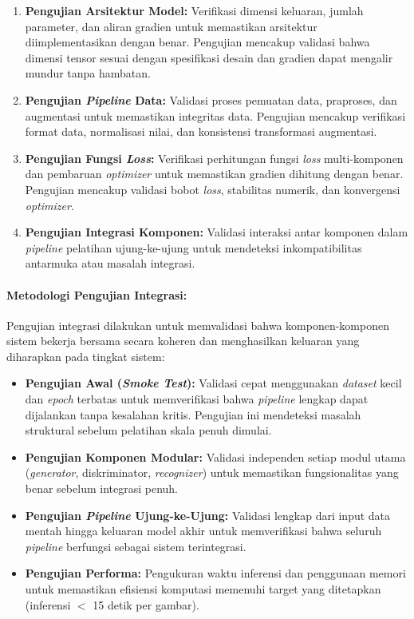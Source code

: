 \documentclass[12pt,a4paper]{article}
\begin{document}
\begin{enumerate}[label=\arabic*., leftmargin=*, nosep]
\item \textbf{Pengujian Arsitektur Model:} Verifikasi dimensi keluaran, jumlah parameter, dan aliran gradien untuk memastikan arsitektur diimplementasikan dengan benar. Pengujian mencakup validasi bahwa dimensi tensor sesuai dengan spesifikasi desain dan gradien dapat mengalir mundur tanpa hambatan.

\item \textbf{Pengujian {\textit{Pipeline}} Data:} Validasi proses pemuatan data, praproses, dan augmentasi untuk memastikan integritas data. Pengujian mencakup verifikasi format data, normalisasi nilai, dan konsistensi transformasi augmentasi.

\item \textbf{Pengujian Fungsi \textit{Loss}:} Verifikasi perhitungan fungsi \textit{loss} multi-komponen dan pembaruan \textit{optimizer} untuk memastikan gradien dihitung dengan benar. Pengujian mencakup validasi bobot \textit{loss}, stabilitas numerik, dan konvergensi \textit{optimizer}.

\item \textbf{Pengujian Integrasi Komponen:} Validasi interaksi antar komponen dalam \textit{pipeline} pelatihan ujung-ke-ujung untuk mendeteksi inkompatibilitas antarmuka atau masalah integrasi.
\end{enumerate}

\paragraph{Metodologi Pengujian Integrasi:}
Pengujian integrasi dilakukan untuk memvalidasi bahwa komponen-komponen sistem bekerja bersama secara koheren dan menghasilkan keluaran yang diharapkan pada tingkat sistem:

\begin{itemize}[leftmargin=*, nosep]
\item \textbf{Pengujian Awal (\textit{Smoke Test}):} Validasi cepat menggunakan \textit{dataset} kecil dan \textit{epoch} terbatas untuk memverifikasi bahwa \textit{pipeline} lengkap dapat dijalankan tanpa kesalahan kritis. Pengujian ini mendeteksi masalah struktural sebelum pelatihan skala penuh dimulai.

\item \textbf{Pengujian Komponen Modular:} Validasi independen setiap modul utama (\textit{generator}, diskriminator, \textit{recognizer}) untuk memastikan fungsionalitas yang benar sebelum integrasi penuh.

\item \textbf{Pengujian \textit{Pipeline} Ujung-ke-Ujung:} Validasi lengkap dari input data mentah hingga keluaran model akhir untuk memverifikasi bahwa seluruh \textit{pipeline} berfungsi sebagai sistem terintegrasi.

\item \textbf{Pengujian Performa:} Pengukuran waktu inferensi dan penggunaan memori untuk memastikan efisiensi komputasi memenuhi target yang ditetapkan (inferensi $<$ 15 detik per gambar).
\end{itemize}
\end{document}
